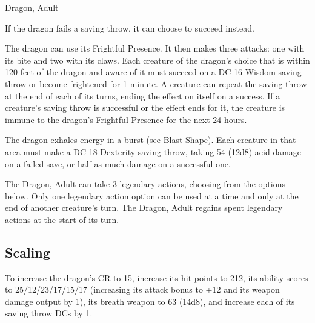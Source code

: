 \begin{DndMonster}[width=\textwidth + 8pt]{Dragon, Adult}
\begin{multicols}{2}
 If the dragon fails a saving throw, it can choose to succeed instead.

 The dragon can use its Frightful Presence. It then makes three attacks: one with its bite and two with its claws.
\DndMonsterAttack[
	name=Bite,
	distance=melee,
	type=weapon,
	mod=+11,
	reach=10,
	dmg=\DndDice{2d10 + 6},
	dmg-type=piercing,
	extra={ plus 4 (1d8) damage of the dragon's Damage Type.}
]
\DndMonsterAttack[
	name=Claw,
	distance=melee,
	type=weapon,
	mod=+11,
	reach=5,
	dmg=\DndDice{2d6 + 6},
	dmg-type=slashing
]
\DndMonsterAttack[
	name=Tail,
	distance=melee,
	type=weapon,
	mod=+11,
	reach=15,
	dmg=\DndDice{2d8 + 6},
	dmg-type=bludgeoning
]
Each creature of the dragon's choice that is within 120 feet of the dragon and aware of it must succeed on a DC 16 Wisdom saving throw or become frightened for 1 minute. A creature can repeat the saving throw at the end of each of its turns, ending the effect on itself on a success. If a creature's saving throw is successful or the effect ends for it, the creature is immune to the dragon's Frightful Presence for the next 24 hours.

The dragon exhales energy in a burst (see Blast Shape). Each creature in that area must make a DC 18 Dexterity saving throw, taking 54 (12d8) acid damage on a failed save, or half as much damage on a successful one.

The Dragon, Adult can take 3 legendary actions, choosing from the options below. Only one legendary action option can be used at a time and only at the end of another creature's turn. The Dragon, Adult regains spent legendary actions at the start of its turn.
\begin{DndMonsterLegendaryActions}
\end{DndMonsterLegendaryActions}

\subsection{Scaling}
To increase the dragon's CR to 15, increase its hit points to 212, its ability scores to 25/12/23/17/15/17 (increasing its attack bonus to +12 and its weapon damage output by 1), its breath weapon to 63 (14d8), and increase each of its saving throw DCs by 1.


\end{multicols}
\end{DndMonster}
